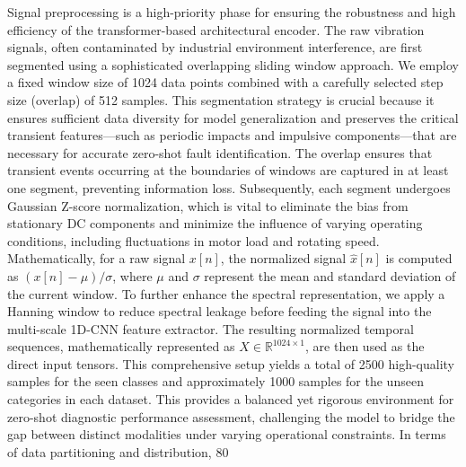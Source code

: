 \documentclass[journal]{IEEEtran}
\begin{document}
Signal preprocessing is a high-priority phase for ensuring the robustness and high efficiency of the transformer-based architectural encoder. The raw vibration signals, often contaminated by industrial environment interference, are first segmented using a sophisticated overlapping sliding window approach. We employ a fixed window size of 1024 data points combined with a carefully selected step size (overlap) of 512 samples. This segmentation strategy is crucial because it ensures sufficient data diversity for model generalization and preserves the critical transient features—such as periodic impacts and impulsive components—that are necessary for accurate zero-shot fault identification. The overlap ensures that transient events occurring at the boundaries of windows are captured in at least one segment, preventing information loss. Subsequently, each segment undergoes Gaussian Z-score normalization, which is vital to eliminate the bias from stationary DC components and minimize the influence of varying operating conditions, including fluctuations in motor load and rotating speed. Mathematically, for a raw signal $x[n]$, the normalized signal $\hat{x}[n]$ is computed as $(x[n] - \mu) / \sigma$, where $\mu$ and $\sigma$ represent the mean and standard deviation of the current window. To further enhance the spectral representation, we apply a Hanning window to reduce spectral leakage before feeding the signal into the multi-scale 1D-CNN feature extractor. The resulting normalized temporal sequences, mathematically represented as $X \in \mathbb{R}^{1024 \times 1}$, are then used as the direct input tensors. This comprehensive setup yields a total of 2500 high-quality samples for the seen classes and approximately 1000 samples for the unseen categories in each dataset. This provides a balanced yet rigorous environment for zero-shot diagnostic performance assessment, challenging the model to bridge the gap between distinct modalities under varying operational constraints. In terms of data partitioning and distribution, 80%
\end{document}
